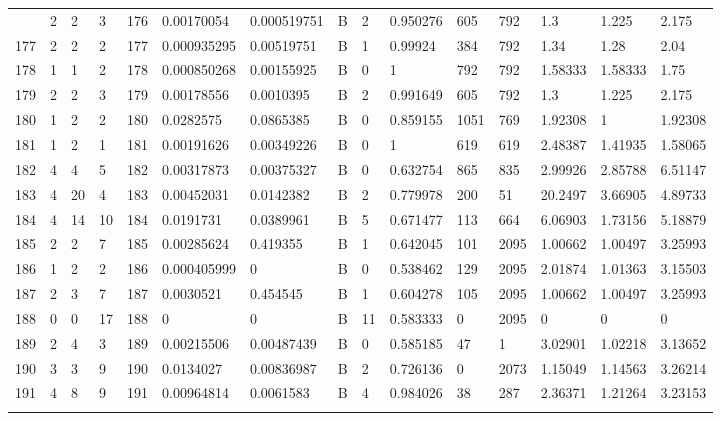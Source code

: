 \begin{latin}
\begin{longtable}{lllllllllllllll}
\begin{comment}
	176 & 2  & 2   & 3  & 176 & 0.00170054     & 0.000519751    & B & 2  & 0.950276 & 605  & 792  & 1.3     & 1.225   & 2.175   \\
	177 & 2  & 2   & 2  & 177 & 0.000935295    & 0.00519751     & B & 1  & 0.99924  & 384  & 792  & 1.34    & 1.28    & 2.04    \\
	178 & 1  & 1   & 2  & 178 & 0.000850268    & 0.00155925     & B & 0  & 1        & 792  & 792  & 1.58333 & 1.58333 & 1.75    \\
	179 & 2  & 2   & 3  & 179 & 0.00178556     & 0.0010395      & B & 2  & 0.991649 & 605  & 792  & 1.3     & 1.225   & 2.175   \\
	180 & 1  & 2   & 2  & 180 & 0.0282575      & 0.0865385      & B & 0  & 0.859155 & 1051 & 769  & 1.92308 & 1       & 1.92308 \\
	181 & 1  & 2   & 1  & 181 & 0.00191626     & 0.00349226     & B & 0  & 1        & 619  & 619  & 2.48387 & 1.41935 & 1.58065 \\
	182 & 4  & 4   & 5  & 182 & 0.00317873     & 0.00375327     & B & 0  & 0.632754 & 865  & 835  & 2.99926 & 2.85788 & 6.51147 \\
	183 & 4  & 20  & 4  & 183 & 0.00452031     & 0.0142382      & B & 2  & 0.779978 & 200  & 51   & 20.2497 & 3.66905 & 4.89733 \\
	184 & 4  & 14  & 10 & 184 & 0.0191731      & 0.0389961      & B & 5  & 0.671477 & 113  & 664  & 6.06903 & 1.73156 & 5.18879 \\
	185 & 2  & 2   & 7  & 185 & 0.00285624     & 0.419355       & B & 1  & 0.642045 & 101  & 2095 & 1.00662 & 1.00497 & 3.25993 \\
	186 & 1  & 2   & 2  & 186 & 0.000405999    & 0              & B & 0  & 0.538462 & 129  & 2095 & 2.01874 & 1.01363 & 3.15503 \\
	187 & 2  & 3   & 7  & 187 & 0.0030521      & 0.454545       & B & 1  & 0.604278 & 105  & 2095 & 1.00662 & 1.00497 & 3.25993 \\
	188 & 0  & 0   & 17 & 188 & 0              & 0              & B & 11 & 0.583333 & 0    & 2095 & 0       & 0       & 0       \\
	189 & 2  & 4   & 3  & 189 & 0.00215506     & 0.00487439     & B & 0  & 0.585185 & 47   & 1    & 3.02901 & 1.02218 & 3.13652 \\
	190 & 3  & 3   & 9  & 190 & 0.0134027      & 0.00836987     & B & 2  & 0.726136 & 0    & 2073 & 1.15049 & 1.14563 & 3.26214 \\
	191 & 4  & 8   & 9  & 191 & 0.00964814     & 0.0061583      & B & 4  & 0.984026 & 38   & 287  & 2.36371 & 1.21264 & 3.23153 \\

\end{comment}
\end{longtable}
\end{latin}
